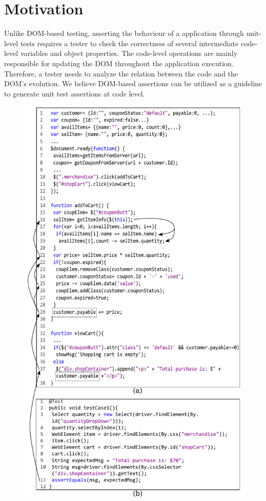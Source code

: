 \section{Motivation} \label{Sec:motivation}
Unlike DOM-based testing, asserting the behaviour of a \javascript application through unit-level tests requires a tester to check the correctness of several intermediate code-level variables and object properties. The code-level operations are mainly responsible for updating the DOM throughout the application execution. Therefore, a tester needs to analyze the relation between the \javascript code and the DOM's evolution. 
We believe DOM-based assertions can be utilized as a guideline to generate unit test assertions at \javascript code level. 

\begin{figure}
  \centering
  \includegraphics[width=0.7\hsize]{fig/example}
  \vspace{0.2in} 
  \label{Fig:example}
\end{figure}


